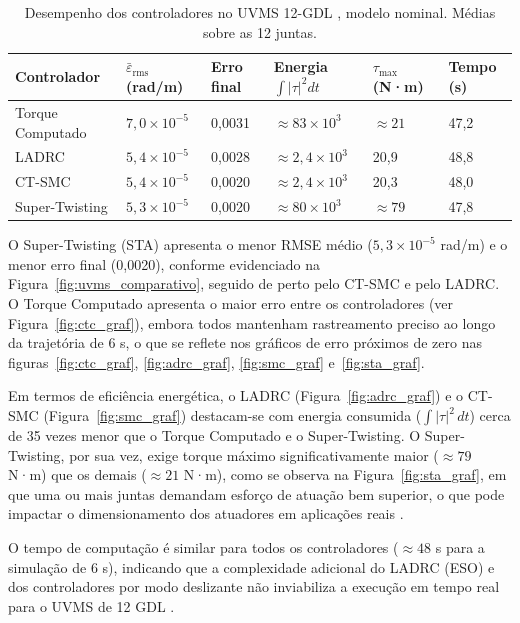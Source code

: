 \begin{table}[h!]
\centering
\caption{Desempenho dos controladores no UVMS 12-GDL , modelo nominal. Médias sobre as 12 juntas.}
\label{tab:uvms_resultados}
\small
\setlength{\tabcolsep}{4pt}
\begin{tabular}{p{2.6cm} p{1.9cm} p{1.4cm} p{2.0cm} p{1.6cm} p{1.3cm}}
\hline
\textbf{Controlador} & $\bar{\varepsilon}_{\text{rms}}$ (rad/m) & Erro final & Energia $\int|\tau|^2 dt$ & $\tau_{\max}$ (N·m) & Tempo (s) \\
\hline
Torque Computado & $7{,}0\times10^{-5}$ & 0,0031 & $\approx 83\times10^3$ & $\approx 21$ & 47,2 \\
LADRC & $5{,}4\times10^{-5}$ & 0,0028 & $\approx 2{,}4\times10^3$ & 20,9 & 48,8 \\
CT-SMC  & $5{,}4\times10^{-5}$ & 0,0020 & $\approx 2{,}4\times10^3$ & 20,3 & 48,0 \\
Super-Twisting & $5{,}3\times10^{-5}$ & 0,0020 & $\approx 80\times10^3$ & $\approx 79$ & 47,8 \\
\hline
\end{tabular}
\end{table}

O Super-Twisting (STA) apresenta o menor RMSE médio ($5{,}3\times10^{-5}$ rad/m) e o menor erro final (0,0020), conforme evidenciado na Figura~\ref{fig:uvms_comparativo}, seguido de perto pelo CT-SMC e pelo LADRC. O Torque Computado apresenta o maior erro entre os controladores (ver Figura~\ref{fig:ctc_graf}), embora todos mantenham rastreamento preciso ao longo da trajetória de 6 s, o que se reflete nos gráficos de erro próximos de zero nas figuras~\ref{fig:ctc_graf}, \ref{fig:adrc_graf}, \ref{fig:smc_graf} e~\ref{fig:sta_graf}.

Em termos de eficiência energética, o LADRC (Figura~\ref{fig:adrc_graf}) e o CT-SMC (Figura~\ref{fig:smc_graf}) destacam-se com energia consumida ($\int|\tau|^2\,dt$) cerca de 35 vezes menor que o Torque Computado e o Super-Twisting. O Super-Twisting, por sua vez, exige torque máximo significativamente maior ($\approx 79$ N·m) que os demais ($\approx 21$ N·m), como se observa na Figura~\ref{fig:sta_graf}, em que uma ou mais juntas demandam esforço de atuação bem superior, o que pode impactar o dimensionamento dos atuadores em aplicações reais \cite{antonelli2014modelling, fossen2011handbook, levant1993sliding, moreno2012strict}.

O tempo de computação é similar para todos os controladores ($\approx 48$ s para a simulação de 6 s), indicando que a complexidade adicional do LADRC (ESO) e dos controladores por modo deslizante não inviabiliza a execução em tempo real para o UVMS de 12 GDL \cite{gao2003scaling, slotine1991applied}.

